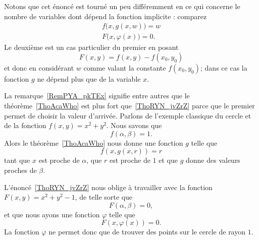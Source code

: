 \begin{remark}\label{RemPYA_pkTEx}
    Notons que cet énoncé est tourné un peu différemment en ce qui concerne le nombre de variables dont dépend la fonction implicite : comparez
    \begin{subequations}
        \begin{align}
            f\big( x,g(x,w) \big)=w\\
            F\big( x,\varphi(x) \big)=0.
        \end{align}
    \end{subequations}
    Le deuxième est un cas particulier du premier en posant
    \begin{equation}
        F(x,y)=f(x,y)-f(x_0,y_0)
    \end{equation}
    et donc en considérant \( w\) comme valant la constante \( f(x_0,y_0)\); dans ce cas la fonction \( g\) ne dépend plus que de la variable \( x\).

\end{remark}

\begin{example}
    La remarque~\ref{RemPYA_pkTEx} signifie entre autres que le théorème~\ref{ThoAcaWho} est plus fort que~\ref{ThoRYN_jvZrZ} parce que le premier permet de choisir la valeur d'arrivée. Parlons de l'exemple classique du cercle et de la fonction \( f(x,y)=x^2+y^2\). Nous savons que
    \begin{equation}
        f(\alpha,\beta)=1.
    \end{equation}
    Alors le théorème~\ref{ThoAcaWho} nous donne une fonction \( g\) telle que
    \begin{equation}
        f(x,g(x,r))=r
    \end{equation}
    tant que \( x\) est proche de \( \alpha\), que \( r\) est proche de \( 1\) et que \( g\) donne des valeurs proches de \( \beta\).

    L'énoncé~\ref{ThoRYN_jvZrZ} nous oblige à travailler avec la fonction \( F(x,y)=x^2+y^2-1\), de telle sorte que
    \begin{equation}
        F(\alpha,\beta)=0,
    \end{equation}
    et que nous ayons une fonction \( \varphi\) telle que
    \begin{equation}
        F(x,\varphi(x))=0.
    \end{equation}
    La fonction \( \varphi\) ne permet donc que de trouver des points sur le cercle de rayon \( 1\).
\end{example}

